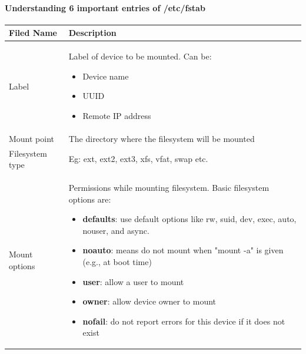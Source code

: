\begin{flushleft}
\paragraph{Understanding 6 important entries of /etc/fstab}
\bigskip
\begin{tabulary}{1.0\textwidth}{|p{5em}|p{23em}|}
	\toprule
	\textbf{Filed Name} & \textbf{Description}\\
	\midrule
	Label & Label of device to be mounted. Can be:
	\begin{itemize}
		\item Device name
		\item UUID
		\item Remote IP address
	\end{itemize}\\
	\hline
	Mount point & The directory where the filesystem will be mounted \\
	\hline
	Filesystem type & Eg: ext, ext2, ext3, xfs, vfat, swap etc. \\
	\hline
	Mount options & Permissions while mounting filesystem. Basic filesystem options are:
	\begin{itemize}
		\item \textbf{defaults}: use default options like rw, suid, dev, exec, auto, nouser, and async.
		\item \textbf{noauto}: means do not mount when "mount -a" is given (e.g., at boot time)
		\item \textbf{user}: allow a user to mount
		\item \textbf{owner}: allow device owner to mount
		\item \textbf{nofail}: do not report errors for this device if it does not exist
	\end{itemize} \\

	\bottomrule
\end{tabulary}

\newpage

\end{flushleft}

